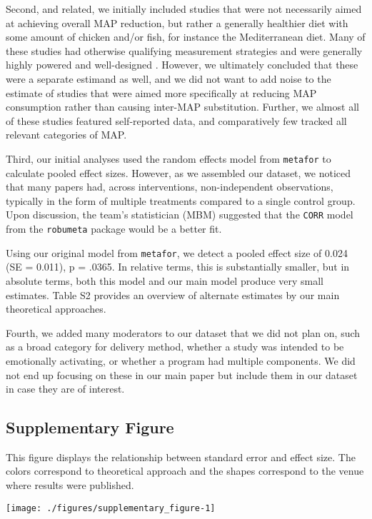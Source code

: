 \documentclass[sn-nature,referee,pdflatex]{sn-jnl}
\begin{document}
Second, and related, we initially included studies that were not
necessarily aimed at achieving overall MAP reduction, but rather a
generally healthier diet with some amount of chicken and/or fish, for
instance the Mediterranean diet. Many of these studies had otherwise
qualifying measurement strategies and were generally highly powered and
well-designed \citep{beresford2006}. However, we ultimately concluded
that these were a separate estimand as well, and we did not want to add
noise to the estimate of studies that were aimed more specifically at
reducing MAP consumption rather than causing inter-MAP substitution.
Further, we almost all of these studies featured self-reported data, and
comparatively few tracked all relevant categories of MAP.

Third, our initial analyses used the random effects model from
\texttt{metafor} to calculate pooled effect sizes. However, as we
assembled our dataset, we noticed that many papers had, across
interventions, non-independent observations, typically in the form of
multiple treatments compared to a single control group. Upon discussion,
the team's statistician (MBM) suggested that the \texttt{CORR} model
from the \texttt{robumeta} package would be a better fit.

Using our original model from \texttt{metafor}, we detect a pooled
effect size of 0.024 (SE = 0.011), p = .0365. In relative terms, this is
substantially smaller, but in absolute terms, both this model and our
main model produce very small estimates. Table S2 provides an overview
of alternate estimates by our main theoretical approaches.

Fourth, we added many moderators to our dataset that we did not plan on,
such as a broad category for delivery method, whether a study was
intended to be emotionally activating, or whether a program had multiple
components. We did not end up focusing on these in our main paper but
include them in our dataset in case they are of interest.

\subsection{Supplementary Figure}\label{supplementary-figure}

This figure displays the relationship between standard error and effect
size. The colors correspond to theoretical approach and the shapes
correspond to the venue where results were published.

\texttt{[image: ./figures/supplementary\_figure-1]}
\end{document}
